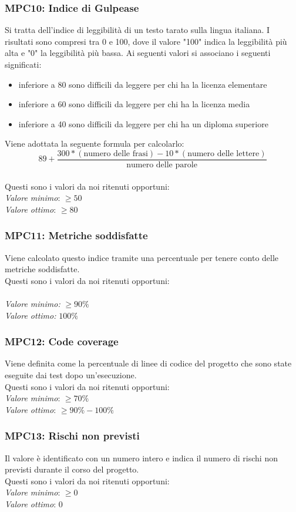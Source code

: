\subsubsection{MPC10: Indice di Gulpease}
Si tratta dell'indice di leggibilità di un testo tarato sulla lingua italiana.
I risultati sono compresi tra 0 e 100, dove il valore "100" indica la leggibilità più alta e "0" la leggibilità più bassa. Ai seguenti valori si associano i seguenti significati:
\begin{itemize}
\item inferiore a 80 sono difficili da leggere per chi ha la licenza elementare
\item inferiore a 60 sono difficili da leggere per chi ha la licenza media
\item inferiore a 40 sono difficili da leggere per chi ha un diploma superiore
\end{itemize}
Viene adottata la seguente formula per calcolarlo:
\begin{equation*}
89+\frac{300*(\text{numero delle frasi})-10*(\text{numero delle lettere})}{\text{numero delle parole}}
\end{equation*}\\
Questi sono i valori da noi ritenuti opportuni:\\
\textit{Valore minimo}: $ \ge 50 $\\ 
\textit{Valore ottimo}: $ \ge 80 $\\

\subsubsection{MPC11: Metriche soddisfatte}
Viene calcolato questo indice tramite una percentuale per tenere conto delle metriche soddisfatte.\\
Questi sono i valori da noi ritenuti opportuni:\\\\
\textit{Valore minimo:} $ \ge 90\% $\\
\textit{Valore ottimo:} $ 100\% $\\

\subsubsection{MPC12: Code coverage}
Viene definita come la percentuale di linee di codice del progetto che sono state eseguite dai test dopo un'esecuzione.\\
Questi sono i valori da noi ritenuti opportuni:\\
\textit{Valore minimo}: $ \ge 70\% $\\
\textit{Valore ottimo}: $ \ge 90\% - 100\% $\\

\subsubsection{MPC13: Rischi non previsti}
Il valore è identificato con un numero intero e indica il numero di rischi non previsti durante il corso del progetto.\\
Questi sono i valori da noi ritenuti opportuni:\\
\textit{Valore minimo}: $ \ge 0$\\
\textit{Valore ottimo}: 0\\
